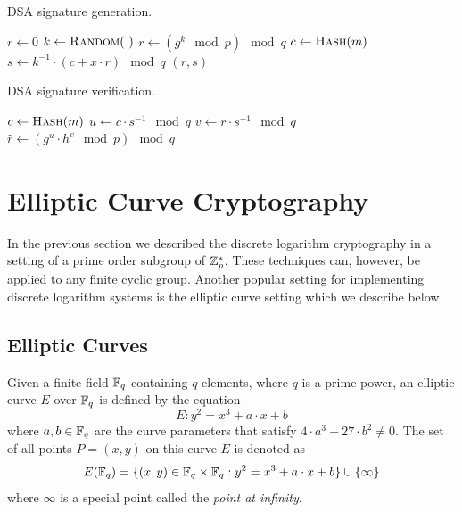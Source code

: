 \begin{algorithm}
  \caption{DSA signature generation.}
  \label{alg:DSA-sign}
  \addtolength{\baselineskip}{1mm}
  \begin{algorithmic}[1]
      \State $r \gets 0$
        \State $k \gets \Call{Random}{~}$
        \State $r \gets (g^k \mod p) \mod q$
      \EndWhile
      \State $c \gets \Call{Hash}{m}$
      \State $s \gets k^{-1} \cdot (c + x \cdot r) \mod q$
      \Return $(r, s)$
    \EndFunction
  \end{algorithmic}
\end{algorithm}
\begin{algorithm}
  \caption{DSA signature verification.}
  \label{alg:DSA-verify}
  \addtolength{\baselineskip}{1mm}
  \begin{algorithmic}[1]
      \State $c \gets \Call{Hash}{m}$
      \State $u \gets c \cdot s^{-1} \mod q$
      \State $v \gets r \cdot s^{-1} \mod q$
      \State $\hat{r} \gets (g^u \cdot h^v \mod p) \mod q$
        \Return {}
      \EndIf
      \Return {}
    \EndFunction
  \end{algorithmic}
\end{algorithm}

\section{Elliptic Curve Cryptography}

In the previous section we described the discrete logarithm cryptography in a
setting of a prime order subgroup of $\mathbb{Z}^*_p$. These techniques can, however,
be applied to any finite cyclic group. Another popular setting for implementing
discrete logarithm systems is the elliptic curve setting which we describe below.

\subsection{Elliptic Curves}

Given a finite field $\mathbb{F}_{q}$ containing $q$ elements, where $q$ is a prime
power, an elliptic curve $E$ over $\mathbb{F}_{q}$ is defined by the equation
\begin{equation}\label{eqn:elliptic_curve}
  E: y^2 = x^3 + a \cdot x + b
\end{equation}
where $a, b \in \mathbb{F}_{q}$ are the curve parameters that satisfy $4 \cdot a^3 + 27 \cdot b^2 \neq 0$.
The set of all points $P = (x, y)$ on this curve $E$ is denoted as
\begin{equation*}
  E(\mathbb{F}_{q}) = \{ (x, y) \in \mathbb{F}_{q} \times \mathbb{F}_{q} : y^2 = x^3 + a \cdot x + b \}
                         \cup \{ \infty \}
\end{equation*}
where $\infty$ is a special point called the \emph{point at infinity}.


